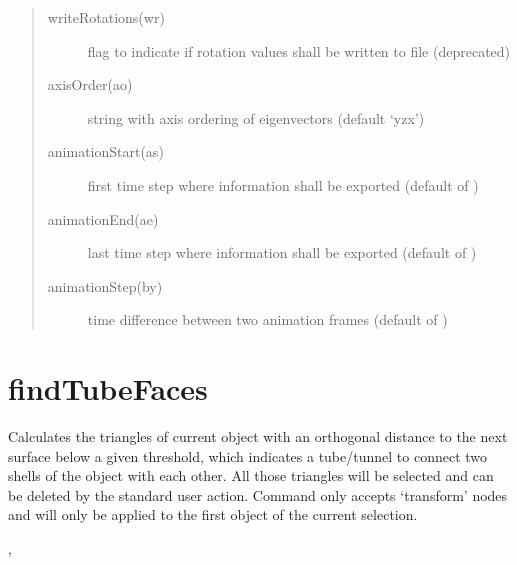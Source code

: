 \documentclass[letterpaper,10pt,english]{sphinxmanual}
\begin{document}
\begin{description}
\begin{quote}
\begin{description}
\item[{writeRotations(wr)}] \leavevmode
flag to indicate if rotation values shall be written to file (deprecated)

\item[{axisOrder(ao)}] \leavevmode
string with axis ordering of eigenvectors (default ‘yzx’)

\item[{animationStart(as)}] \leavevmode
first time step where information shall be exported (default  of )

\item[{animationEnd(ae)}] \leavevmode
last time step where information shall be exported (default  of )

\item[{animationStep(by)}] \leavevmode
time difference between two animation frames (default  of )

\end{description}\end{quote}

\end{description}


\section{findTubeFaces}
\label{\detokenize{pk_src.findTubeFaces::doc}}\label{\detokenize{pk_src.findTubeFaces:findtubefaces}}\label{\detokenize{pk_src.findTubeFaces:id1}}
{\hyperref[\detokenize{index:commands}]{}}
\label{\detokenize{pk_src.findTubeFaces:module-pk_src.findTubeFaces}}
Calculates the triangles of current object with an orthogonal distance to the next surface below a given threshold, which indicates a tube/tunnel to connect two shells of the object with each other. All those triangles will be selected and can be deleted by the standard user action.
Command only accepts ‘transform’ nodes and will only be applied to the first object of the current selection.

 {\hyperref[\detokenize{pk_src.cleanup:cleanup}]{}}, {\hyperref[\detokenize{pk_src.getShells:getshells}]{}}
\end{document}
